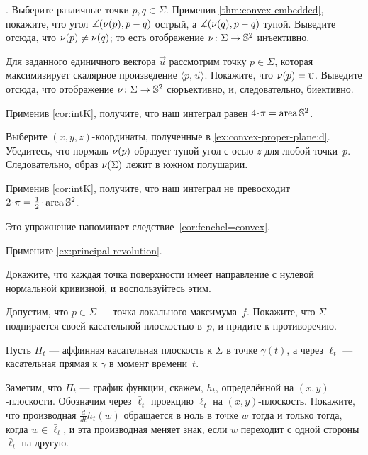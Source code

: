 \begin{multicols}{2}
\parbf{\ref{ex:intK}}.
Выберите различные точки $p,q\in\Sigma$.
Применив \ref{thm:convex-embedded}, покажите, что угол $\measuredangle(\nu(p),p-q)$ острый, а $\measuredangle(\nu(q),p-q)$ тупой.
Выведите отсюда, что $\nu(p)\ne\nu(q)$;
то есть отображение $\nu\colon\Sigma\to\mathbb{S}^2$ инъективно.

Для заданного единичного вектора $\vec u$ рассмотрим точку $p\in \Sigma$, которая максимизирует скалярное произведение $\langle p,\vec u\rangle$.
Покажите, что $\nu(p)=\text{\sc{u}}$.
Выведите отсюда, что отображение $\nu\colon\Sigma\to\mathbb{S}^2$ сюръективно, и, следовательно, биективно.

Применив \ref{cor:intK}, получите, что наш интеграл равен $4\cdot\pi=\area\mathbb{S}^2$.

Выберите $(x,y,z)$-координаты, полученные в \ref{ex:convex-proper-plane:d}.
Убедитесь, что нормаль $\nu(p)$ образует тупой угол с осью $z$ для любой точки~$p$.
Следовательно, образ $\nu(\Sigma)$ лежит в южном полушарии.

Применив \ref{cor:intK}, получите, что наш интеграл не превосходит $2\cdot\pi=\tfrac12\cdot\area\mathbb{S}^2$.

Это упражнение напоминает следствие~\ref{cor:fenchel=convex}.

\setcounter{eqtn}{0}

Примените \ref{ex:principal-revolution}.

Докажите, что каждая точка поверхности имеет направление с нулевой нормальной кривизной, и воспользуйтесь этим.

Допустим, что $p\in \Sigma$ --- точка локального максимума~$f$.
Покажите, что $\Sigma$ подпирается своей касательной плоскостью в~$p$,
и придите к противоречию.

Пусть $\Pi_t$ --- аффинная касательная плоскость к $\Sigma$ в точке $\gamma(t)$, а через $\ell_t$ --- касательная прямая к $\gamma$ в момент времени~$t$.

Заметим, что $\Pi_t$ --- график функции, скажем, $h_t$, определённой на $(x, y)$-плоскости.
Обозначим через $\bar\ell_t$ проекцию $\ell_t$ на $(x, y)$-плоскость.
Покажите, что производная $\tfrac{d}{dt}h_t(w)$ обращается в ноль в точке $w$ тогда и только тогда, когда $w\in \bar\ell_t$, и эта производная меняет знак, если $w$ переходит с одной стороны $\bar\ell_t$ на другую.


\end{multicols}
